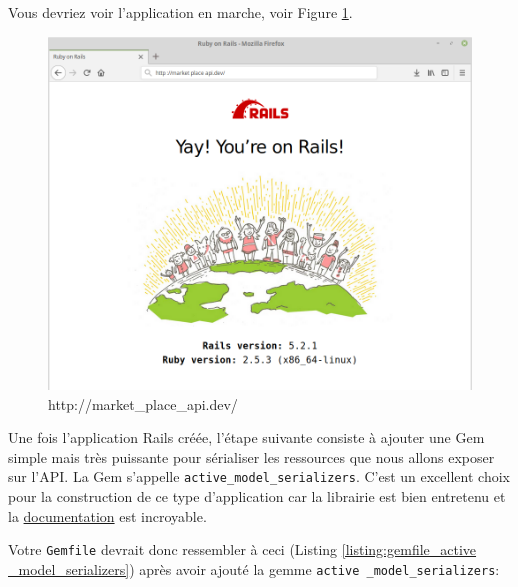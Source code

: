\documentclass[]{report}
\begin{document}
        Vous devriez voir l'application en marche, voir Figure \ref{fig:pow_running}.

        \begin{figure}
          \includegraphics[width=\linewidth]{img/pow_running.png}
          \caption{http://market\_place\_api.dev/}
          \label{fig:pow_running}
        \end{figure}

        Une fois l'application Rails créée, l'étape suivante consiste à ajouter une Gem simple mais très puissante pour sérialiser les ressources que nous allons exposer sur l'API. La Gem s'appelle \verb|active_model_serializers|. C'est un excellent choix pour la construction de ce type d'application car la librairie est bien entretenu et la \href{https://github.com/rails-api/active_model_serializers}{documentation} est incroyable.

        Votre \verb|Gemfile| devrait donc ressembler à ceci (Listing \ref{listing:gemfile_active _model_serializers}) après avoir ajouté la gemme \verb|active _model_serializers|:
\end{document}
